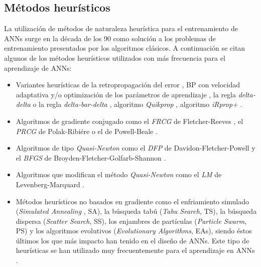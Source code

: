 \subsection{Métodos heurísticos}\label{redesheuristicas}
\noindent La utilización de métodos de naturaleza heurística
\cite{Walczak1999,Abraham2000,Glover2003} para el entrenamiento de ANNs surge
en la década de  los  90  como  solución a los  problemas  de  entrenamiento presentados
por los algoritmos clásicos. A continuación se citan algunos de los métodos heurísticos
utilizados con más frecuencia para el aprendizaje de ANNs:
\begin{itemize}
	\item Variantes heurísticas de la retropropagación del error
	\cite{Riedmiller1994}, BP con velocidad adaptativa y/o optimización de
	los parámetros de aprendizaje \cite{Zainuddin2005}, la regla \textit{delta-delta} o la
	regla	\textit{delta-bar-delta} \cite{Jacobs1988}, algoritmo \textit{Quikprop}
	\cite{Veitch1991}, algoritmo \textit{iRprop+} \cite{Igel2000}.
	\item Algoritmos de gradiente conjugado como el \textit{FRCG} de Fletcher-Reeves
	\cite{Fletcher1964}, el \textit{PRCG} de Polak-Ribiére  \cite{Polak1969}
	o	el	de Powell-Beale \cite{Powell1977}.
	\item Algoritmos de tipo \textit{Quasi-Newton} como el \textit{DFP} de
	Davidon-Fletcher-Powell	\cite{Davidon1991} y el
	\textit{BFGS} de Broyden-Fletcher-Golfarb-Shannon	\cite{Broyden1970}.
	\item Algoritmos que modifican el método \textit{Quasi-Newton} como el \textit{LM} de
\\
	Levenberg-Marquard \cite{Marquardt1963}.
	\item Métodos heurísticos no basados en gradiente como el enfriamiento simulado
	(\textit{Simulated Annealing} , SA), la búsqueda  tabú (\textit{Tabu Search}, TS), la
	búsqueda dispersa (\textit{Scatter Search}, SS),
	los enjambres de partículas (\textit{Particle Swarm}, PS) y los algoritmos evolutivos
	(\textit{Evolutionary Algorithms}, EAs), siendo éstos últimos los que más impacto han
	tenido en el diseño de ANNs.
	Este	tipo de heurísticas se han utilizado muy frecuentemente para el	aprendizaje en
	ANNs \cite{Kordik2010,Alba2006}.
\end{itemize}

\paginavaciacompleta